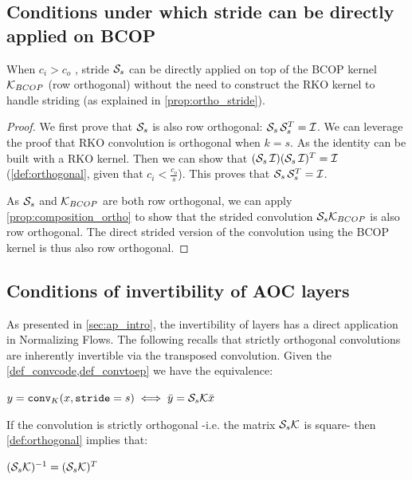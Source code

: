     \subsection{Conditions under which stride can be directly applied on BCOP}\label{proof:stride_opt}

        When $ c_i > c_o $ , stride $ \mathcal{S}_{s}$ can be directly applied on top of the BCOP kernel $\mathcal{K}_{BCOP}$ (row orthogonal) without the need to construct the RKO kernel to handle striding (as explained in \cref{prop:ortho_stride}). 
        \begin{proof}
        We first prove that $ \mathcal{S}_{s}$ is also row orthogonal: $ \mathcal{S}_{s} \, \mathcal{S}_{s}^T = \mathcal{I}$. We can leverage the proof that RKO convolution is orthogonal when $k=s$. As the identity can be built with a RKO kernel. Then we can show  that $ (\mathcal{S}_{s} \, \mathcal{I})(\mathcal{S}_{s} \, \mathcal{I})^T = \mathcal{I} $ (\cref{def:orthogonal}, given that $ c_i < \frac{c_o}{s}$). This proves that $ \mathcal{S}_{s} \, \mathcal{S}_{s}^T = \mathcal{I} $. %

        As $\mathcal{S}_{s}$ and $\mathcal{K}_{BCOP}$ are both row orthogonal, we can apply \cref{prop:composition_ortho} to show that the strided convolution $\mathcal{S}_{s}\mathcal{K}_{BCOP}$ is also row orthogonal.
        The direct strided version of the convolution using the BCOP kernel is thus also row orthogonal.
    \end{proof}
    
    \subsection{Conditions of invertibility of AOC layers}\label{ap:invert}
    As presented in \cref{sec:ap_intro}, the invertibility of layers has a direct application in Normalizing Flows. The following recalls that strictly orthogonal convolutions are inherently invertible via the transposed convolution.
    Given the \cref{def_convcode,def_convtoep} we have the equivalence:
    
    $y = \mathtt{conv}_{K}(x, \mathtt{stride}=s) \iff \bar{y} = \mathcal{S}_{s} \mathcal{K} \bar{x}$

    If the convolution is strictly orthogonal -i.e. the matrix $\mathcal{S}_{s} \mathcal{K}$ is square- then \cref{def:orthogonal} implies that:

    $(\mathcal{S}_{s} \mathcal{K})^{-1} = (\mathcal{S}_{s} \mathcal{K})^T$

